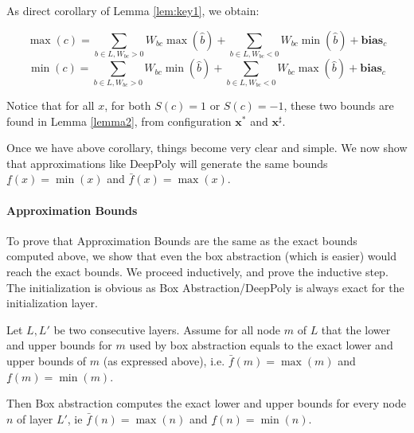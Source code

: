 		As direct corollary of Lemma \ref{lem:key1}, we obtain:
		
		\begin{corollary}
			\label{cor1}
			$$\max(c)=\sum_{b \in L, W_{bc}>0}W_{bc} \max(\hat{b}) + \sum_{b \in L, W_{bc}<0}W_{bc} \min(\hat{b}) + \boldsymbol{bias}_c$$
			$$\min(c)=\sum_{b \in L, W_{bc}>0}W_{bc} \min(\hat{b}) + \sum_{b \in L, W_{bc}<0}W_{bc} \max(\hat{b}) + \boldsymbol{bias}_c$$
		\end{corollary}
		
		
		Notice that for all $x$, for both $S(c)=1$ or $S(c)=-1$, these two bounds are found in Lemma \ref{lemma2},
		from configuration $\boldsymbol{x}^*$ and $\boldsymbol{x}^\sharp$.
		
		
		
		Once we have above corollary, things become very clear and simple. We now show that approximations like DeepPoly will generate the same bounds 
		$\underline{f}(x)=\min(x)$ and $\bar{f}(x)=\max(x)$.
		
		\paragraph{Approximation Bounds}
		
		To prove that Approximation Bounds are the same as the exact bounds computed above, 
		we show that even the box abstraction (which is easier) would reach the exact bounds.
		We proceed inductively, and prove the inductive step.
		The initialization is obvious as Box Abstraction/DeepPoly is always exact for the initialization layer.
		
		\begin{lemma}
			Let $L,L'$ be two consecutive layers.
			Assume for all node $m$ of $L$ that the lower and upper bounds for $m$ used by box abstraction equals to the exact lower and upper bounds of $m$ (as expressed above), i.e.
			$\bar{f}(m)=\max(m)$ and $\underline{f}(m)=\min(m)$.
			
			Then Box abstraction computes the exact lower and upper bounds for every node $n$ of layer $L'$, ie $\bar{f}(n)=\max(n)$ and $\underline{f}(n)=\min(n)$.
		\end{lemma}
		
